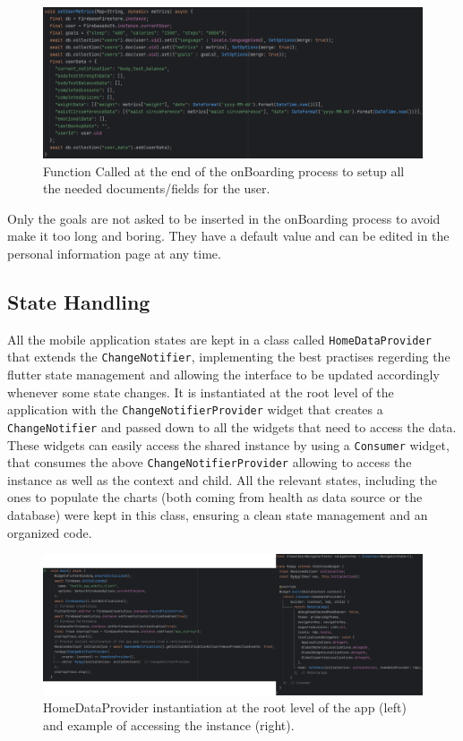 \begin{figure}
    \includegraphics[width=1.0\linewidth]{./images/onBoarding.png}
    \caption{Function Called at the end of the onBoarding process to setup all the needed documents/fields for the user.}
\end{figure}

\noindent Only the goals are not asked to be inserted in the onBoarding process to avoid make it too long and boring. They have a default value and can be edited in the personal information page at any time.
\newpage

\subsection{State Handling}
All the mobile application states are kept in a class called \texttt{HomeDataProvider} that extends the \texttt{ChangeNotifier}, implementing the best practises regerding the flutter state management and allowing the interface to be updated accordingly whenever some state changes. It is instantiated at the root level of the application with the \texttt{ChangeNotifierProvider} widget that creates a \texttt{ChangeNotifier} and passed down to all the widgets that need to access the data. These widgets can easily access the shared instance by using a \texttt{Consumer} widget, that consumes the above \texttt{ChangeNotifierProvider} allowing to access the instance as well as the context and child. All the relevant states, including the ones to populate the charts (both coming from health as data source or the database) were kept in this class, ensuring a clean state management and an organized code.
\vspace{10ex}
\begin{figure}
    \includegraphics[width=1.0\linewidth]{./images/provider.png}
    \caption{HomeDataProvider instantiation at the root level of the app (left) and example of accessing the instance (right).}
\end{figure}
\newpage
